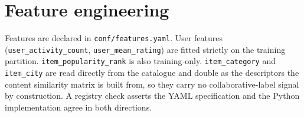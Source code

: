 \section{Feature engineering}
Features are declared in \texttt{conf/features.yaml}. User features
(\texttt{user\_activity\_count}, \texttt{user\_mean\_rating}) are fitted
strictly on the training partition. \texttt{item\_popularity\_rank} is also
training-only. \texttt{item\_category} and \texttt{item\_city} are read
directly from the catalogue and double as the descriptors the content
similarity matrix is built from, so they carry no collaborative-label
signal by construction. A registry check asserts the YAML specification and
the Python implementation agree in both directions.
